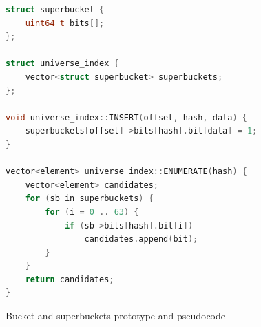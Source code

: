 \begin{figure}[h!]
	\label{figure-bucketshop-pseudocode}
\begin{tcolorbox}
\begin{lstlisting}[language=c++,tabsize=2]
struct superbucket {
	uint64_t bits[];
};

struct universe_index {
	vector<struct superbucket> superbuckets;
};

void universe_index::INSERT(offset, hash, data) {
	superbuckets[offset]->bits[hash].bit[data] = 1;
}

vector<element> universe_index::ENUMERATE(hash) {
	vector<element> candidates;
	for (sb in superbuckets) {
		for (i = 0 .. 63) {
			if (sb->bits[hash].bit[i]) 
				candidates.append(bit);
		}
	}
	return candidates;
}
\end{lstlisting}
\end{tcolorbox}
\caption{Bucket and superbuckets prototype and pseudocode}
\end{figure}



